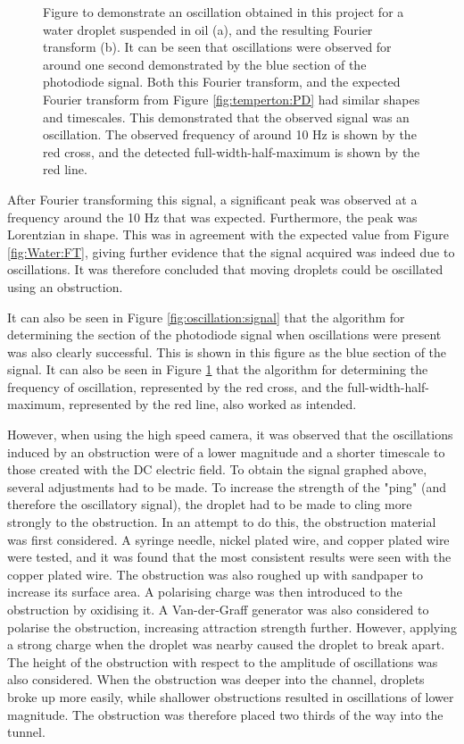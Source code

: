 \documentclass{physics_article_B}
\begin{document}
\begin{figure}[H]
\begin{subfigure}[b]{0.48\textwidth}
                \label{fig:oscillation:FT}
                \end{subfigure}
            \caption{Figure to demonstrate an oscillation obtained in this project for a water droplet suspended in oil (a), and the resulting Fourier transform (b). It can be seen that oscillations were observed for around one second demonstrated by the blue section of the photodiode signal. Both this Fourier transform, and the expected Fourier transform from Figure \ref{fig:temperton:PD} had similar shapes and timescales. This demonstrated that the observed signal was an oscillation. The observed frequency of around 10 Hz is shown by the red cross, and the detected full-width-half-maximum is shown by the red line. }\label{fig:oscillation}
        \end{figure} 
        
        After Fourier transforming this signal, a significant peak was observed at a frequency around the 10 Hz that was expected. Furthermore, the peak was Lorentzian in shape. This was in agreement with the expected value from Figure \ref{fig:Water:FT}, giving further evidence that the signal acquired was indeed due to oscillations. It was therefore concluded that moving droplets could be oscillated using an obstruction.
        
        It can also be seen in Figure \ref{fig:oscillation:signal} that the algorithm for determining the section of the photodiode signal when oscillations were present was also clearly successful. This is shown in this figure as the blue section of the signal. It can also be seen in Figure \ref{fig:oscillation:FT} that the algorithm for determining the frequency of oscillation, represented by the red cross, and the full-width-half-maximum, represented by the red line, also worked as intended.
        
        However, when using the high speed camera, it was observed that the oscillations induced by an obstruction were of a lower magnitude and a shorter timescale to those created with the DC electric field. To obtain the signal graphed above, several adjustments had to be made. To increase the strength of the "ping" (and therefore the oscillatory signal), the droplet had to be made to cling more strongly to the obstruction. In an attempt to do this, the obstruction material was first considered. A syringe needle, nickel plated wire, and copper plated wire were tested, and it was found that the most consistent results were seen with the copper plated wire. The obstruction was also roughed up with sandpaper to increase its surface area. A polarising charge was then introduced to the obstruction by oxidising it. A Van-der-Graff generator was also considered to polarise the obstruction, increasing attraction strength further. However, applying a strong charge when the droplet was nearby caused the droplet to break apart. The height of the obstruction with respect to the amplitude of oscillations was also considered. When the obstruction was deeper into the channel, droplets broke up more easily, while shallower obstructions resulted in oscillations of lower magnitude. The obstruction was therefore placed two thirds of the way into the tunnel. 
        
\end{document}
